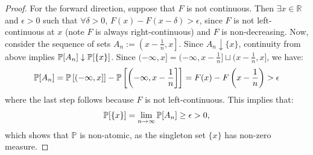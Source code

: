 \begin{proof}
	For the forward direction, suppose that $F$ is not continuous. Then $\exists x\in\mathbb R$ and $\epsilon > 0$ such that $\forall\delta > 0$, $F(x) - F(x - \delta) > \epsilon$, since $F$ is not left-continuous at $x$ (note $F$ is always right-continuous) and $F$ is non-decreasing. Now, consider the sequence of sets $A_n := \left(x - \frac{1}{n}, x\right]$. Since $A_n\downarrow \{x\}$, continuity from above implies $\P[A_n]\downarrow \P[\{x\}]$. Since $(-\infty, x] = (-\infty, x - \frac{1}{n}]\sqcup (x - \frac{1}{n}, x]$, we have:
	\begin{equation}
		\P[A_n] = \P\left[(-\infty, x]\right] - \P\left[\left( -\infty, x - \frac{1}{n}\right]\right] = F(x) - F\left(x - \frac{1}{n}\right) > \epsilon
	\end{equation} 
	where the last step follows because $F$ is not left-continuous. This implies that:
	\begin{equation}
		\P[\{x\}] = \lim_{n\rightarrow\infty} \P[A_n]\geq \epsilon > 0,
	\end{equation}
	which shows that $\mathbb P$ is non-atomic, as the singleton set $\{x\}$ has non-zero measure. 
	

\end{proof}
